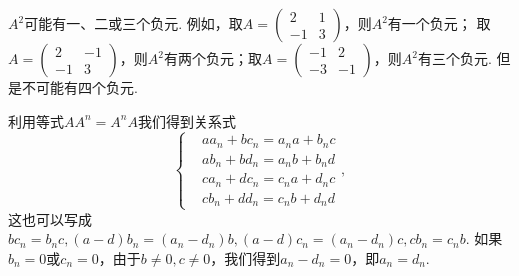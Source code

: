 \begin{solution}
  $A^2$可能有一、二或三个负元. 例如，取$A=\begin{pmatrix}
    2 & 1 \\
    -1 & 3
  \end{pmatrix}$，则$A^2$有一个负元； 取$A=\begin{pmatrix}
    2 & -1 \\
    -1 & 3
  \end{pmatrix}$，则$A^2$有两个负元；取$A=\begin{pmatrix}
    -1 & 2 \\
    -3 & -1
  \end{pmatrix}$，则$A^2$有三个负元. 但是不可能有四个负元.
\end{solution}

\begin{solution}
  利用等式$AA^n=A^nA$我们得到关系式
  \[
    \left\{
      \begin{aligned}
        & aa_n + bc_n = a_na + b_nc \\
        & ab_n + bd_n = a_nb + b_nd \\
        & ca_n + dc_n = c_na + d_nc \\
        & cb_n + dd_n = c_nb + d_nd
      \end{aligned}
    \right.,
  \]
  这也可以写成$bc_n=b_nc,(a-d)b_n=(a_n-d_n)b,(a-d)c_n=(a_n-d_n)c,cb_n=c_nb$. 如果$b_n=0$或$c_n=0$，由于$b\ne0,c\ne0$，我们得到$a_n-d_n=0$，即$a_n=d_n$.
\end{solution}

